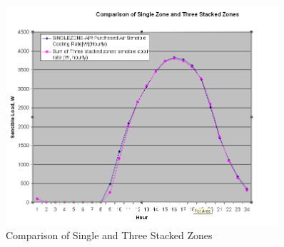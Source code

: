 \begin{figure}[hbtp] %
\centering
\includegraphics[width=0.9\textwidth, height=0.9\textheight, keepaspectratio=true]{media/image398.png}
\caption{Comparison of Single and Three Stacked Zones \protect \label{fig:comparison-of-single-and-three-stacked-zones}}
\end{figure}
